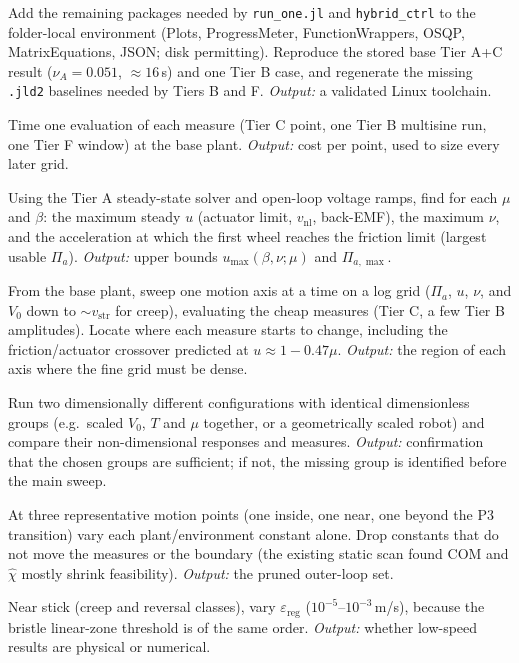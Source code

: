 \documentclass[11pt]{article}
\begin{document}
\begin{description}[leftmargin=0pt,itemsep=6pt]
\item[P0. Toolchain and reproduction.] Add the remaining packages needed by
  \texttt{run\_one.jl} and \texttt{hybrid\_ctrl} to the folder-local environment
  (Plots, ProgressMeter, FunctionWrappers, OSQP, MatrixEquations, JSON; disk
  permitting). Reproduce the stored base Tier A+C result ($\nu_A = 0.051$,
  $\approx 16$\,s) and one Tier B case, and regenerate the missing
  \texttt{.jld2} baselines needed by Tiers B and F.
  \emph{Output:} a validated Linux toolchain.

\item[P1. Timing benchmark.] Time one evaluation of each measure (Tier C point,
  one Tier B multisine run, one Tier F window) at the base plant.
  \emph{Output:} cost per point, used to size every later grid.

\item[P2. Feasible motion envelope per plant set.] Using the Tier A
  steady-state solver and open-loop voltage ramps, find for each $\mu$ and
  $\beta$: the maximum steady $u$ (actuator limit, $v_{\mathrm{nl}}$, back-EMF),
  the maximum $\nu$, and the acceleration at which the first wheel reaches the
  friction limit (largest usable $\Pi_a$).
  \emph{Output:} upper bounds $u_{\max}(\beta,\nu;\mu)$ and $\Pi_{a,\max}$.

\item[P3. One-at-a-time transition scans.] From the base plant, sweep one motion
  axis at a time on a log grid ($\Pi_a$, $u$, $\nu$, and $V_0$ down to
  $\sim v_{\mathrm{str}}$ for creep), evaluating the cheap measures (Tier C, a few
  Tier B amplitudes). Locate where each measure starts to change, including the
  friction/actuator crossover predicted at $u \approx 1 - 0.47\mu$.
  \emph{Output:} the region of each axis where the fine grid must be dense.

\item[P4. Similarity (collapse) check.] Run two dimensionally different
  configurations with identical dimensionless groups (e.g.\ scaled $V_0$, $T$
  and $\mu$ together, or a geometrically scaled robot) and compare their
  non-dimensional responses and measures.
  \emph{Output:} confirmation that the chosen groups are sufficient; if not, the
  missing group is identified before the main sweep.

\item[P5. Plant-parameter sensitivity.] At three representative motion points
  (one inside, one near, one beyond the P3 transition) vary each plant/environment
  constant alone. Drop constants that do not move the measures or the boundary
  (the existing static scan found COM and $\hat\chi$ mostly shrink feasibility).
  \emph{Output:} the pruned outer-loop set.

\item[P6. Regularisation sensitivity.] Near stick (creep and reversal classes),
  vary $\varepsilon_{\mathrm{reg}}$ ($10^{-5}$--$10^{-3}$\,m/s), because the bristle
  linear-zone threshold is of the same order.
  \emph{Output:} whether low-speed results are physical or numerical.
\end{description}
\end{document}
